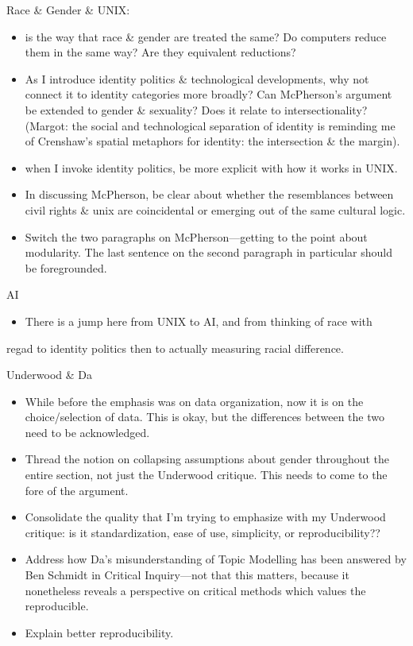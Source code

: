 \documentclass[11pt]{article}
\begin{document}
\begin{enumerate}
Race \& Gender \& UNIX: 
\begin{itemize}
\item is the way that race \& gender are treated the same? Do computers
reduce them in the same way? Are they equivalent reductions?
\item As I introduce identity politics \& technological developments, why
not connect it to identity categories more broadly? Can McPherson's
argument be extended to gender \& sexuality? Does it relate to
intersectionality? (Margot: the social and technological separation
of identity is reminding me of Crenshaw's spatial metaphors for
identity: the intersection \& the margin).
\item when I invoke identity politics, be more explicit with how it works
in UNIX.
\item In discussing McPherson, be clear about whether the resemblances
between civil rights \& unix are coincidental or emerging out of the
same cultural logic.
\item Switch the two paragraphs on McPherson---getting to the point about
modularity. The last sentence on the second paragraph in particular
should be foregrounded.
\end{itemize}

AI
\begin{itemize}
\item There is a jump here from UNIX to AI, and from thinking of race with
\end{itemize}
regad to identity politics then to actually measuring racial
difference. 

Underwood \& Da
\begin{itemize}
\item While before the emphasis was on data organization, now it is on the
choice/selection of data. This is okay, but the differences between
the two need to be acknowledged.
\item Thread the notion on collapsing assumptions about gender throughout
the entire section, not just the Underwood critique. This needs to
come to the fore of the argument.
\item Consolidate the quality that I'm trying to emphasize with my
Underwood critique: is it standardization, ease of use, simplicity,
or reproducibility??
\item Address how Da's misunderstanding of Topic Modelling has been
answered by Ben Schmidt in Critical Inquiry---not that this matters,
because it nonetheless reveals a perspective on critical methods
which values the reproducible.
\item Explain better reproducibility.
\end{itemize}
\end{enumerate}
\end{document}
